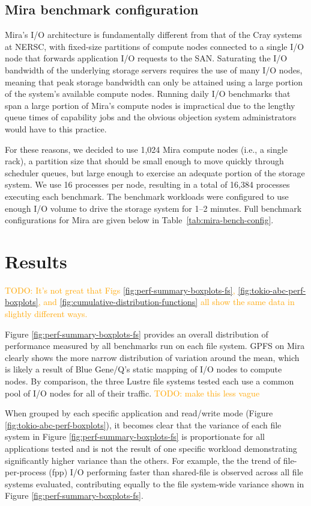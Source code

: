 \documentclass[conference,10pt,compsocconf]{IEEEtran}
\newcommand{\todo}[1]{\textcolor{Orange}{TODO: #1}}
\begin{document}
\subsection{Mira benchmark configuration}

Mira's I/O architecture is fundamentally different from that of the Cray
systems at NERSC, with fixed-size partitions of compute nodes connected to
a single I/O node that forwards application I/O requests to the SAN.
Saturating the I/O bandwidth of the underlying storage servers requires the
use of many I/O nodes, meaning that peak storage bandwidth can only be
attained using a large portion of the system's available compute nodes.
Running daily I/O benchmarks that span a large portion of Mira's compute
nodes is impractical due to the lengthy queue times of capability jobs and
the obvious objection system administrators would have to this practice.

For these reasons, we decided to use 1,024 Mira compute nodes (i.e., a single
rack), a partition size that should be small enough to move quickly through
scheduler queues, but large enough to exercise an adequate portion of the
storage system. We use 16 processes per node, resulting in a total of 16,384
processes executing each benchmark. The benchmark workloads were configured
to use enough I/O volume to drive the storage system for 1--2 minutes.
Full benchmark configurations for Mira are given below in
Table~\ref{tab:mira-bench-config}.

\section{Results} \label{results}

\todo{It's not great that Figs \ref{fig:perf-summary-boxplots-fs}, \ref{fig:tokio-abc-perf-boxplots}, and \ref{fig:cumulative-distribution-functions} all show the same data in slightly different ways.}

Figure \ref{fig:perf-summary-boxplots-fs} provides an overall distribution of
performance measured by all benchmarks run on each file system.  GPFS on Mira
clearly shows the more narrow distribution of variation around the mean, which
is likely a result of Blue Gene/Q's static mapping of I/O nodes to compute
nodes.  By comparison, the three Lustre file systems tested each use a common
pool of I/O nodes for all of their traffic. \todo{make this less vague}

When grouped by each specific application and read/write mode (Figure
\ref{fig:tokio-abc-perf-boxplots}), it becomes clear that the variance of each
file system in Figure \ref{fig:perf-summary-boxplots-fs} is proportionate for
all applications tested and is not the result of one specific workload
demonstrating significantly higher variance than the others.  For example, the
the trend of file-per-process (fpp) I/O performing faster than shared-file is
observed across all file systems evaluated, contributing equally to the 
file system-wide variance shown in Figure \ref{fig:perf-summary-boxplots-fs}.
\end{document}
